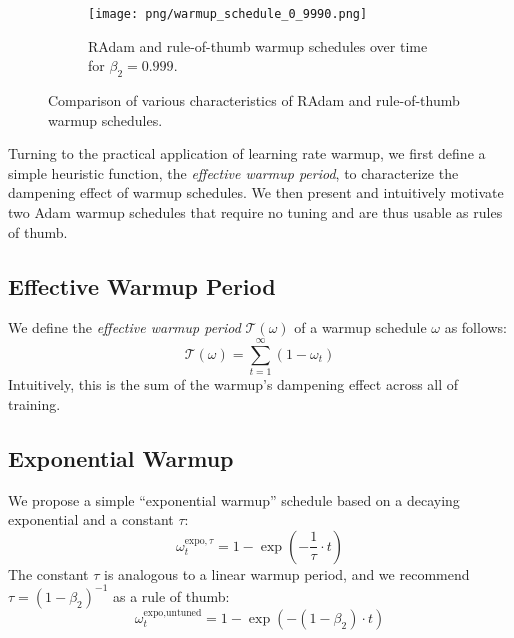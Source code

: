 {\begin{figure*}[ht]
\begin{subfigure}[t]{.49\linewidth}
  \texttt{[image: png/warmup\_schedule\_0\_9990.png]}
  
  \caption{RAdam and rule-of-thumb warmup schedules over time for $\beta_2 = 0.999$.}
  
  \label{fig:warmup-schedule}
\end{subfigure}

\caption{Comparison of various characteristics of RAdam and rule-of-thumb warmup schedules.}

\label{fig:radam-rule-of-thumb-comparison}\end{figure*}

Turning to the practical application of learning rate warmup, we first define a simple heuristic function, the \emph{effective warmup period}, to characterize the dampening effect of warmup schedules. We then present and intuitively motivate two Adam warmup schedules that require no tuning and are thus usable as rules of thumb.

\subsection{Effective Warmup Period}

We define the \emph{effective warmup period} $\mathcal{T}(\omega)$ of a warmup schedule $\omega$ as follows:
\begin{equation*}
    \mathcal{T}(\omega) = \sum_{t = 1}^\infty \left( 1 - \omega_t \right)
\end{equation*}
Intuitively, this is the sum of the warmup's dampening effect across all of training.

\subsection{Exponential Warmup}

We propose a simple ``exponential warmup'' schedule based on a decaying exponential and a constant $\tau$:
\begin{equation}
    \omega_t^{\text{expo}, \tau} = 1 - \exp \left( -\frac{1}{\tau} \cdot t \right)
\end{equation}
The constant $\tau$ is analogous to a linear warmup period, and we recommend $\tau = (1 - \beta_2)^{-1}$ as a rule of thumb:
\begin{equation}
    \label{eqn:exp-rule-of-thumb}
    \omega_t^{\text{expo}, \text{untuned}} = 1 - \exp \left( -(1 - \beta_2) \cdot t \right)
\end{equation}

}
